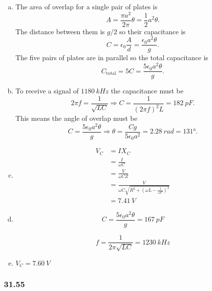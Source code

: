 \documentclass{article}
\begin{document}
\begin{enumerate}[(a)]
  \item The area of overlap for a single pair of plates is \[A = \frac{\pi a^2}{2 \pi} \theta = \frac{1}{2} a^2 \theta.\] The distance between them is $g / 2$ so their capacitance is \[C = \epsilon_0 \frac{A}{d} = \frac{\epsilon_0 a^2 \theta}{g}.\] The five pairs of plates are in parallel so the total capacitance is \[C_\text{total} = 5 C = \frac{5 \epsilon_0 a^2 \theta}{g}.\]

  \item To receive a signal of $\qty{1180}{kHz}$ the capacitance must be \[2 \pi f = \frac{1}{\sqrt{L C}} \Rightarrow C = \frac{1}{(2 \pi f)^2 L} = \qty{182}{pF}.\] This means the angle of overlap must be \[C = \frac{5 \epsilon_0 a^2 \theta}{g} \Rightarrow \theta = \frac{C g}{5 \epsilon_0 a^2} = \qty{2.28}{rad} = \ang{131}.\]

  \item

        \begin{align*}
          V_C & = I X_C                                                                          \\
              & = \frac{I}{\omega C}                                                             \\
              & = \frac{V}{\omega C Z}                                                           \\
              & = \frac{V}{\omega C \sqrt{R^2 + \left( \omega L - \frac{1}{\omega C} \right)^2}} \\
              & = \qty{7.41}{V}
        \end{align*}

  \item

        \[C = \frac{5 \epsilon_0 a^2 \theta}{g} = \qty{167}{pF}\]

        \[f = \frac{1}{2 \pi \sqrt{L C}} = \qty{1230}{kHz}\]

  \item $V_C = \qty{7.60}{V}$
\end{enumerate}

\subsubsection{31.55}
\end{document}
